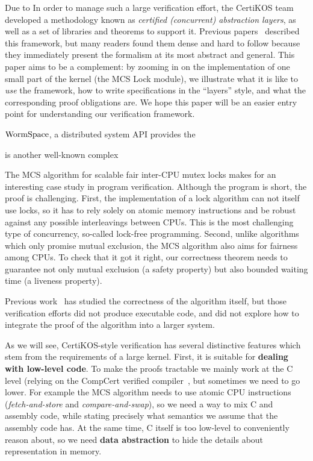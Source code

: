 Due to 
In order to manage such a large verification effort, the CertiKOS team developed a methodology known as \emph{certified (concurrent) abstraction layers}, as well as a set of libraries and theorems to support it. Previous papers~\cite{deepspec}
described this framework, but many readers found them  dense and hard to follow because they immediately present the formalism at its most abstract and general.
This paper aims to be a complement: by zooming in on the implementation of one small part of the kernel (the MCS Lock module), we illustrate  what it is like to \emph{use} the framework, how to write specifications in the ``layers'' style, and what the corresponding proof obligations are. We hope this paper will be an easier entry point for understanding our verification framework.




$\mathrm{WormSpace}$, a distributed system API provides the 


is another well-known complex 

The MCS algorithm for scalable fair inter-CPU mutex locks makes for an interesting case study in program verification.
Although the program is short, the proof is challenging.
First, the implementation of a lock algorithm can not itself use locks, so it has to rely solely on atomic memory instructions and be robust against any possible interleavings between CPUs. This is the most challenging type of concurrency, so-called lock-free programming.
Second, unlike algorithms which only promise mutual exclusion, the MCS algorithm also aims for fairness among CPUs. To check that it got it right, our correctness theorem needs to guarantee not only mutual exclusion (a safety property) but also bounded waiting time (a liveness property).

Previous work~\cite{lili16,ogata:mcs-lock} has studied the
correctness of the algorithm itself, but those verification efforts
did not produce executable code, and did not explore how to integrate
the proof of the algorithm into a larger system.


As we will see, CertiKOS-style verification has several distinctive features which stem from the requirements of a large kernel. First, it is suitable for {\bf dealing with low-level code}. To make the proofs tractable we mainly work at the C level (relying on the CompCert verified compiler~\cite{compcert}, but sometimes we need to go lower. For example the MCS algorithm needs to use atomic CPU instructions ({\em fetch-and-store} and {\em compare-and-swap}), so we need a way to  mix C and assembly code, while stating precisely what semantics we assume that the assembly code has. At the same time, C itself is too low-level to conveniently reason about, so we need {\bf data abstraction} to hide the details about representation in memory.

